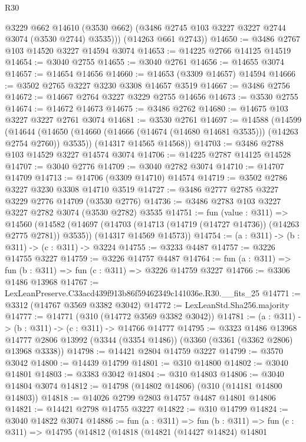 \begin{lexlean}{R30}
\begin{coremodule}
          @3229
          @662
          @14610
          (@3530 @662)
          (@3486 @2745 @103 @3227 @3227 @2744 @3074 (@3530 @2744) @3535)))
      (@14263 @661 @2743))
@14650 := @3486 @2767 @103 @14520 @3227 @14594 @3074
@14653 := @14225 @2766 @14125 @14519
@14654 := @3040 @2755
@14655 := @3040 @2761
@14656 := @14655 @3074
@14657 := @14654 @14656
@14660 := @14653 (@3309 @14657) @14594
@14666 := @3502 @2765 @3227 @3230 @3308 @14657 @3519
@14667 := @3486 @2756
@14672 := @14667 @2764 @3227 @3229 @2755 @14656
@14673 := @3530 @2755
@14674 := @14672 @14673
@14675 := @3486 @2762
@14680 := @14675 @103 @3227 @3227 @2761 @3074
@14681 := @3530 @2761
@14697 := @14588
    (@14599
      (@14644 (@14650 (@14660 (@14666 (@14674 (@14680 @14681 @3535))) (@14263 @2754 @2760)) @3535))
      (@14317 @14565 @14568))
@14703 := @3486 @2788 @103 @14529 @3227 @14574 @3074
@14706 := @14225 @2787 @14125 @14528
@14707 := @3040 @2776
@14709 := @3040 @2782 @3074
@14710 := @14707 @14709
@14713 := @14706 (@3309 @14710) @14574
@14719 := @3502 @2786 @3227 @3230 @3308 @14710 @3519
@14727 := @3486 @2777 @2785 @3227 @3229 @2776 @14709 (@3530 @2776)
@14736 := @3486 @2783 @103 @3227 @3227 @2782 @3074 (@3530 @2782) @3535
@14751 := fun (value : @311) =>
  @14560
    (@14582
      (@14697 (@14703 (@14713 (@14719 (@14727 @14736)) (@14263 @2775 @2781)) @3535))
      (@14317 @14569 @14573))
@14754 := (a : @311) -> (b : @311) -> (c : @311) -> @3224
@14755 := @3233 @4487
@14757 := @3226 @14755 @3227
@14759 := @3226 @14757 @4487
@14764 := fun (a : @311) => fun (b : @311) => fun (c : @311) => @3226 @14759 @3227
@14766 := @3306 @1486 @13968
@14767 := LexLeanPreserve.C33acd439f913b86f59462349c141036e.R30.__fits_25
@14771 := @3312 (@14767 @3569 @3382 @3042)
@14772 := LexLeanStd.Sha256.majority
@14777 := @14771 (@310 (@14772 @3569 @3382 @3042))
@14781 := (a : @311) -> (b : @311) -> (c : @311) -> @14766 @14777
@14795 := @3323
    @1486
    @13968
    @14777
    @2806
    @13992
    (@3344 (@3354 @1486))
    (@3360 (@3361 (@3362 @2806) @13968 @3338))
@14798 := @14421 @2804 @14759 @3227
@14799 := @3570 @3042
@14800 := @14439 @14799
@14801 := @310 @14800
@14802 := @3040 @14801
@14803 := @3383 @3042
@14804 := @310 @14803
@14806 := @3040 @14804 @3074
@14812 := @14798 (@14802 @14806) (@310 (@14181 @14800 @14803))
@14818 := @14026 @2799 @2803 @14757 @4487 @14801 @14806
@14821 := @14421 @2798 @14755 @3227
@14822 := @310 @14799
@14824 := @3040 @14822 @3074
@14886 := fun (a : @311) =>
  fun (b : @311) =>
  fun (c : @311) =>
  @14795
    (@14812
      (@14818
        (@14821
          (@14427 @14824)
          @14801

\end{coremodule}
\end{lexlean}
